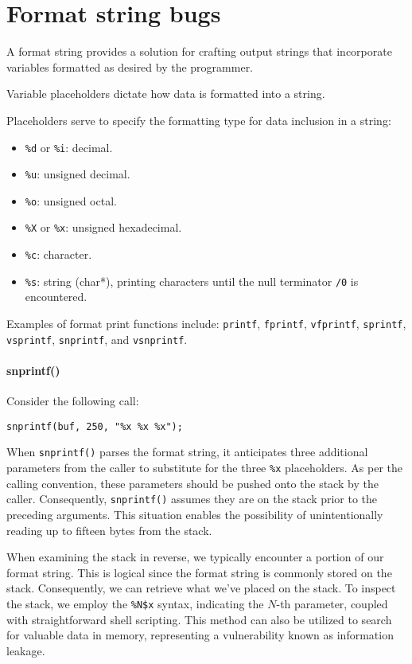 \section{Format string bugs}

\begin{definition}
    A format string provides a solution for crafting output strings that incorporate variables formatted as desired by the programmer.
\end{definition}
\begin{definition}
    Variable placeholders dictate how data is formatted into a string.
\end{definition}
Placeholders serve to specify the formatting type for data inclusion in a string:
\begin{itemize}
    \item \texttt{\%d} or \texttt{\%i}: decimal. 
    \item \texttt{\%u}: unsigned decimal.
    \item \texttt{\%o}: unsigned octal.
    \item \texttt{\%X} or \texttt{\%x}: unsigned hexadecimal.
    \item \texttt{\%c}: character.
    \item \texttt{\%s}: string (char*), printing characters until the null terminator \texttt{/0} is encountered.
\end{itemize}
Examples of format print functions include: \texttt{printf}, \texttt{fprintf}, \texttt{vfprintf}, \texttt{sprintf}, \texttt{vsprintf}, \texttt{snprintf}, and \texttt{vsnprintf}.

\paragraph*{snprintf()}
Consider the following call: 
\begin{verbatim}
snprintf(buf, 250, "%x %x %x");
\end{verbatim}
When \texttt{snprintf()} parses the format string, it anticipates three additional parameters from the caller to substitute for the three \texttt{\%x} placeholders. 
As per the calling convention, these parameters should be pushed onto the stack by the caller. 
Consequently, \texttt{snprintf()} assumes they are on the stack prior to the preceding arguments. 
This situation enables the possibility of unintentionally reading up to fifteen bytes from the stack. 

When examining the stack in reverse, we typically encounter a portion of our format string. 
This is logical since the format string is commonly stored on the stack. 
Consequently, we can retrieve what we've placed on the stack.
To inspect the stack, we employ the \texttt{\%N\$x} syntax, indicating the $N$-th parameter, coupled with straightforward shell scripting.
This method can also be utilized to search for valuable data in memory, representing a vulnerability known as information leakage.

